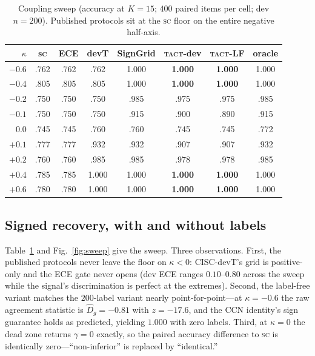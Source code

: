 \documentclass[twoside,11pt]{article}
\newcommand{\Dhat}{\widehat{D}}
\newcommand{\SC}{\textsc{sc}}
\newcommand{\TACT}{\textsc{tact}}
\begin{document}
\begin{table}[t]
\centering
\caption{Coupling sweep (accuracy at $K{=}15$; $400$ paired items per cell; dev $n{=}200$). Published protocols sit at the \SC{} floor on the entire negative half-axis.}
\label{tab:sweep}
\setlength{\tabcolsep}{3.4pt}
\begin{tabular}{r cc cc cc c}
\toprule
$\kappa$ & \SC & ECE & devT & SignGrid & \textbf{\TACT-dev} & \textbf{\TACT-LF} & oracle\\
\midrule
$-0.6$ & .762 & .762 & .762 & 1.000 & \textbf{1.000} & \textbf{1.000} & 1.000\\
$-0.4$ & .805 & .805 & .805 & 1.000 & \textbf{1.000} & \textbf{1.000} & 1.000\\
$-0.2$ & .750 & .750 & .750 & .985 & .975 & .975 & .985\\
$-0.1$ & .750 & .750 & .750 & .915 & .900 & .890 & .915\\
$0.0$  & .745 & .745 & .760 & .760 & .745 & .745 & .772\\
$+0.1$ & .777 & .777 & .932 & .932 & .907 & .907 & .932\\
$+0.2$ & .760 & .760 & .985 & .985 & .978 & .978 & .985\\
$+0.4$ & .785 & .785 & 1.000 & 1.000 & \textbf{1.000} & \textbf{1.000} & 1.000\\
$+0.6$ & .780 & .780 & 1.000 & 1.000 & \textbf{1.000} & \textbf{1.000} & 1.000\\
\bottomrule
\end{tabular}
\end{table}
\subsection{Signed recovery, with and without labels}
Table~\ref{tab:sweep} and Fig.~\ref{fig:sweep} give the sweep. Three observations. First, the published protocols never leave the floor on $\kappa<0$: CISC-devT's grid is positive-only and the ECE gate never opens (dev ECE ranges $0.10$--$0.80$ across the sweep while the signal's discrimination is perfect at the extremes). Second, the label-free variant matches the $200$-label variant nearly point-for-point---at $\kappa{=}{-}0.6$ the raw agreement statistic is $\Dhat_g=-0.81$ with $z=-17.6$, and the CCN identity's sign guarantee holds as predicted, yielding $1.000$ with zero labels. Third, at $\kappa=0$ the dead zone returns $\gamma=0$ exactly, so the paired accuracy difference to \SC{} is identically zero---``non-inferior'' is replaced by ``identical.''
\end{document}
